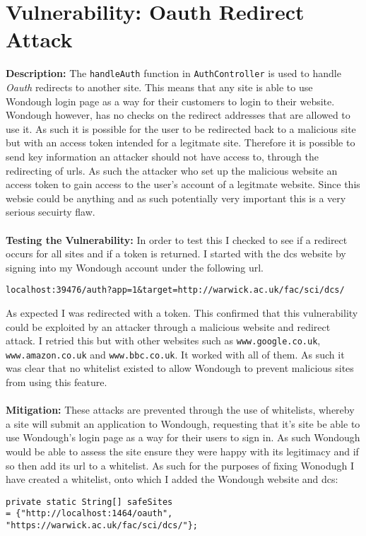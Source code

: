 \section{Vulnerability: Oauth Redirect Attack}
\label{sec:background}
\textbf{Description:} The \verb|handleAuth| function in \verb|AuthController| is used to handle \textit{Oauth} redirects to another site. This means that any site is able to use
Wondough login page as a way for their customers to login to their website. Wondough however, has no checks on the redirect addresses that are allowed to use it. As such it is
possible for the user to be redirected back to a malicious site but with an access token intended for a legitmate site. Therefore it is possible to send key information an attacker
should not have access to, through the redirecting of urls. As such the attacker who set up the malicious website an access token to gain access to the user's account of a legitmate
website. Since this websie could be anything and as such potentially very important this is a very serious secuirty flaw.\\ \\
\textbf{Testing the Vulnerability:} In order to test this I checked to see if a redirect occurs for all sites and if a token is returned. I started with the dcs website by signing
into my Wondough account under the following url.
\begin{verbatim}
localhost:39476/auth?app=1&target=http://warwick.ac.uk/fac/sci/dcs/
\end{verbatim}
As expected I was redirected with a token. This confirmed that this vulnerability could be exploited by an attacker through a malicious website and redirect attack. I retried this
but with other websites such as \verb|www.google.co.uk|, \verb|www.amazon.co.uk| and \verb|www.bbc.co.uk|. It worked with all of them. As such it was clear that no whitelist 
existed to allow Wondough to prevent malicious sites from using this feature. \\ \\
\textbf{Mitigation:} These attacks are prevented through the use of whitelists, whereby a site will submit an application to Wondough, requesting that it's site be able to use
Wondough's login page as a way for their users to sign in. As such Wondough would be able to assess the site ensure they were happy with its legitimacy and if so then add its url
to a whitelist. As such for the purposes of fixing Wonodugh I have created a whitelist, onto which I added the Wondough website and dcs:
\begin{verbatim}
private static String[] safeSites
= {"http://localhost:1464/oauth", "https://warwick.ac.uk/fac/sci/dcs/"};
\end{verbatim}
